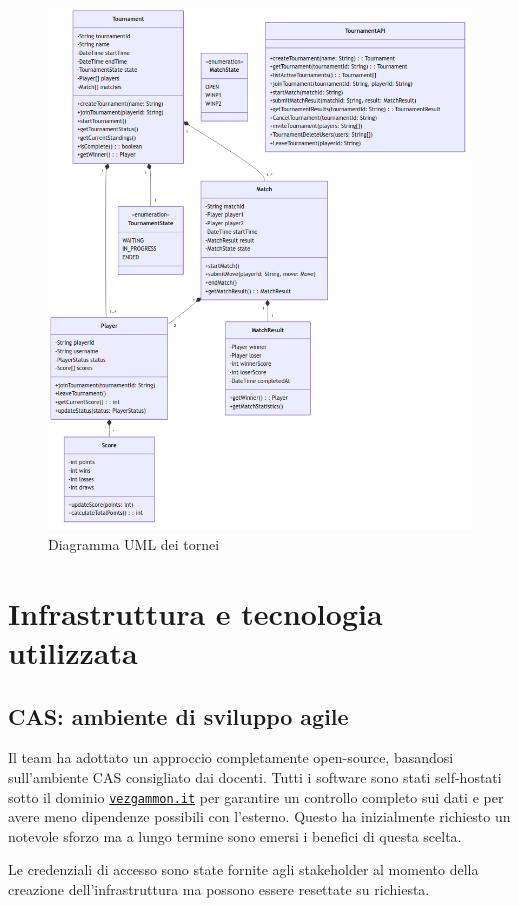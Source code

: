 \documentclass{article}
\begin{document}
\begin{figure}[H]
    \centering
    \includegraphics[width=12cm]{uml-tournaments}
    \caption{Diagramma UML dei tornei}
    \label{fig:tournaments}
\end{figure}

\section{Infrastruttura e tecnologia utilizzata}

\subsection{CAS: ambiente di sviluppo agile}

Il team ha adottato un approccio completamente open-source, basandosi sull'ambiente CAS consigliato dai docenti. 
Tutti i software sono stati self-hostati sotto il dominio \href{https://vezgammon.it}{\texttt{vezgammon.it}} per garantire 
un controllo completo sui dati e per avere meno dipendenze possibili con l'esterno. Questo ha inizialmente richiesto 
un notevole sforzo ma a lungo termine sono emersi i benefici di questa scelta.

Le credenziali di accesso sono state fornite agli stakeholder al momento della creazione dell'infrastruttura ma possono 
essere resettate su richiesta.
\end{document}
